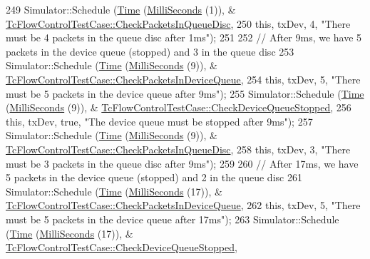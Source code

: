 \begin{DoxyCode}
249       Simulator::Schedule (\hyperlink{classns3_1_1Time}{Time} (\hyperlink{group__timecivil_gaf26127cf4571146b83a92ee18679c7a9}{MilliSeconds} (1)), &
      \hyperlink{classTcFlowControlTestCase_ac6d0b6a74dd29a21369bf1d26795098d}{TcFlowControlTestCase::CheckPacketsInQueueDisc},
250                           \textcolor{keyword}{this}, txDev, 4, \textcolor{stringliteral}{"There must be 4 packets in the queue disc after 1ms"});
251 
252       \textcolor{comment}{// After 9ms, we have 5 packets in the device queue (stopped) and 3 in the queue disc}
253       Simulator::Schedule (\hyperlink{classns3_1_1Time}{Time} (\hyperlink{group__timecivil_gaf26127cf4571146b83a92ee18679c7a9}{MilliSeconds} (9)), &
      \hyperlink{classTcFlowControlTestCase_a7ad467b39fdb155daea4b048619f6d12}{TcFlowControlTestCase::CheckPacketsInDeviceQueue},
254                           \textcolor{keyword}{this}, txDev, 5, \textcolor{stringliteral}{"There must be 5 packets in the device queue after 9ms"});
255       Simulator::Schedule (\hyperlink{classns3_1_1Time}{Time} (\hyperlink{group__timecivil_gaf26127cf4571146b83a92ee18679c7a9}{MilliSeconds} (9)), &
      \hyperlink{classTcFlowControlTestCase_a4ccc9564c9142984fa8041f67b4a518a}{TcFlowControlTestCase::CheckDeviceQueueStopped},
256                           \textcolor{keyword}{this}, txDev, \textcolor{keyword}{true}, \textcolor{stringliteral}{"The device queue must be stopped after 9ms"});
257       Simulator::Schedule (\hyperlink{classns3_1_1Time}{Time} (\hyperlink{group__timecivil_gaf26127cf4571146b83a92ee18679c7a9}{MilliSeconds} (9)), &
      \hyperlink{classTcFlowControlTestCase_ac6d0b6a74dd29a21369bf1d26795098d}{TcFlowControlTestCase::CheckPacketsInQueueDisc},
258                           \textcolor{keyword}{this}, txDev, 3, \textcolor{stringliteral}{"There must be 3 packets in the queue disc after 9ms"});
259 
260       \textcolor{comment}{// After 17ms, we have 5 packets in the device queue (stopped) and 2 in the queue disc}
261       Simulator::Schedule (\hyperlink{classns3_1_1Time}{Time} (\hyperlink{group__timecivil_gaf26127cf4571146b83a92ee18679c7a9}{MilliSeconds} (17)), &
      \hyperlink{classTcFlowControlTestCase_a7ad467b39fdb155daea4b048619f6d12}{TcFlowControlTestCase::CheckPacketsInDeviceQueue},
262                           \textcolor{keyword}{this}, txDev, 5, \textcolor{stringliteral}{"There must be 5 packets in the device queue after 17ms"});
263       Simulator::Schedule (\hyperlink{classns3_1_1Time}{Time} (\hyperlink{group__timecivil_gaf26127cf4571146b83a92ee18679c7a9}{MilliSeconds} (17)), &
      \hyperlink{classTcFlowControlTestCase_a4ccc9564c9142984fa8041f67b4a518a}{TcFlowControlTestCase::CheckDeviceQueueStopped},

\end{DoxyCode}
